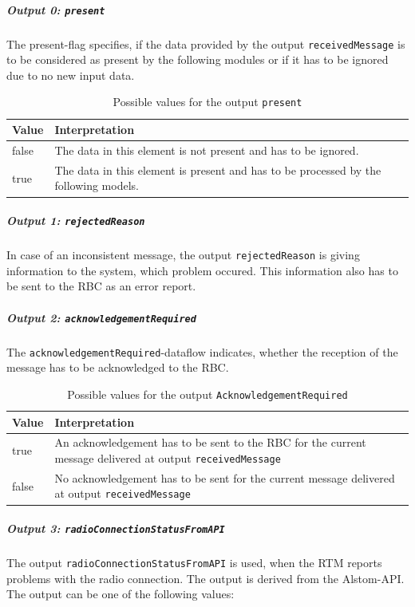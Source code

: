 \documentclass{template/openetcs_report}
\begin{document}
\subparagraph{Output 0: \texttt{present}}
The present-flag specifies, if the data provided by the output \texttt{receivedMessage} is to be considered as present by the following modules or if it has to be ignored due to no new input data.

\begin{table}[H]
  \begin{tabular}{| l | p{13cm} |}
    \hline
    \textbf{Value} & \textbf{Interpretation}\\ \hline
    false & The data in this element is not present and has to be ignored. \\
    true & The data in this element is present and has to be processed by the following models. \\
    \hline
  \end{tabular} 
  \caption{Possible values for the output \texttt{present}}
  \label{tbl:rcvpresent}
\end{table}

\subparagraph{Output 1: \texttt{rejectedReason}}
In case of an inconsistent message, the output \texttt{rejectedReason} is giving information to the system, which problem occured. This information also has to be sent to the RBC as an error report.

\subparagraph{Output 2: \texttt{acknowledgementRequired}}

The \texttt{acknowledgementRequired}-dataflow indicates, whether the reception of the message has to be acknowledged to the RBC.

\begin{table}[H]
  \begin{tabular}{| l | p{13cm} |}
    \hline
    \textbf{Value} & \textbf{Interpretation}\\ \hline
    true & An acknowledgement has to be sent to the RBC for the current message delivered at output \texttt{receivedMessage} \\
    false & No acknowledgement has to be sent for the current message delivered at output \texttt{receivedMessage} \\
    \hline
  \end{tabular} 
  \caption{Possible values for the output \texttt{AcknowledgementRequired}}
  \label{tbl:AcknowledgementRequiredTable}
\end{table}

\subparagraph{Output 3: \texttt{radioConnectionStatusFromAPI}}
The output \texttt{radioConnectionStatusFromAPI} is used, when the RTM reports problems with the radio connection. The output is derived from the Alstom-API. %
The output can be one of the following values:
\end{document}
